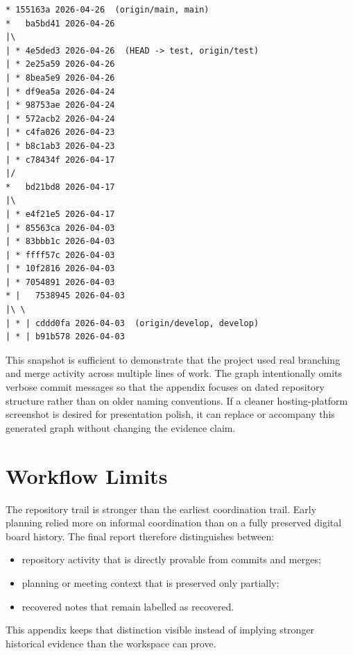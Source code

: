 \begin{Verbatim}[fontsize=\scriptsize]
* 155163a 2026-04-26  (origin/main, main)
*   ba5bd41 2026-04-26
|\  
| * 4e5ded3 2026-04-26  (HEAD -> test, origin/test)
| * 2e25a59 2026-04-26
| * 8bea5e9 2026-04-26
| * df9ea5a 2026-04-24
| * 98753ae 2026-04-24
| * 572acb2 2026-04-24
| * c4fa026 2026-04-23
| * b8c1ab3 2026-04-23
| * c78434f 2026-04-17
|/  
*   bd21bd8 2026-04-17
|\  
| * e4f21e5 2026-04-17
| * 85563ca 2026-04-03
| * 83bbb1c 2026-04-03
| * ffff57c 2026-04-03
| * 10f2816 2026-04-03
| * 7054891 2026-04-03
* |   7538945 2026-04-03
|\ \  
| * | cddd0fa 2026-04-03  (origin/develop, develop)
| * | b91b578 2026-04-03
\end{Verbatim}

This snapshot is sufficient to demonstrate that the project used real branching and merge activity across multiple lines of work. The graph intentionally omits verbose commit messages so that the appendix focuses on dated repository structure rather than on older naming conventions. If a cleaner hosting-platform screenshot is desired for presentation polish, it can replace or accompany this generated graph without changing the evidence claim.

\section{Workflow Limits}

The repository trail is stronger than the earliest coordination trail. Early planning relied more on informal coordination than on a fully preserved digital board history. The final report therefore distinguishes between:

\begin{itemize}
    \item repository activity that is directly provable from commits and merges;
    \item planning or meeting context that is preserved only partially;
    \item recovered notes that remain labelled as recovered.
\end{itemize}

This appendix keeps that distinction visible instead of implying stronger historical evidence than the workspace can prove.
